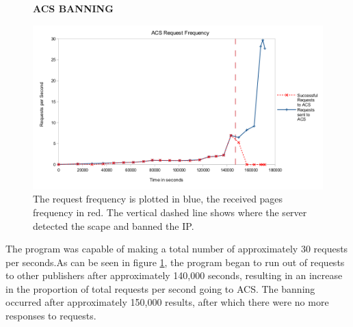 \begin{figure}[H]
    \centering
    \textbf{ACS BANNING}\par\medskip
    \includegraphics[scale=0.8]{Data_Acquisition/ACS_crash_line.png}
    \caption{The request frequency is plotted in blue, the received pages frequency in red. The vertical dashed line shows where the server detected the scape and banned the IP.}
     \label{fig:ACSBAN}
\end{figure}
The program was capable of making a total number of approximately 30 requests per seconds.As can be seen in figure \ref{fig:ACSBAN}, the program began to run out of requests to other publishers after approximately 140,000 seconds, resulting in an increase in  the proportion of total requests per second going to ACS. The banning occurred after approximately 150,000 results, after which there were no more responses to requests.

